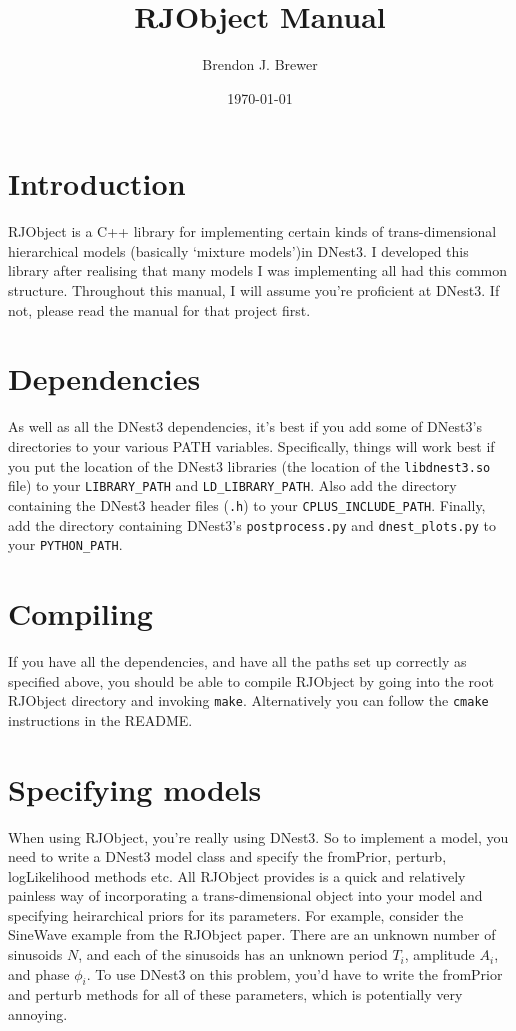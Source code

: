 \documentclass[a4paper, 11pt]{article}
\title{RJObject Manual}
\author{Brendon J. Brewer}
\date{\today}
\begin{document}
\maketitle

\section{Introduction}
RJObject is a C++ library for implementing certain kinds of trans-dimensional
hierarchical models (basically `mixture models')in DNest3. I developed this
library after realising that many models I was implementing all had this
common structure.
Throughout this manual, I will assume you're proficient at
DNest3. If not, please read the manual for that project first.

\section{Dependencies}
As well as all the DNest3 dependencies, it's best if you add some of DNest3's
directories to your various PATH variables. Specifically, things will work best
if you put the location of the DNest3 libraries (the location of
the {\tt libdnest3.so} file) to your {\tt LIBRARY\_PATH} and
{\tt LD\_LIBRARY\_PATH}. Also add the directory containing the DNest3 header
files ({\tt *.h}) to your {\tt CPLUS\_INCLUDE\_PATH}. Finally, add the
directory containing DNest3's {\tt postprocess.py} and {\tt dnest\_plots.py} to
your {\tt PYTHON\_PATH}.

\section{Compiling}
If you have all the dependencies, and have all the paths set up correctly as
specified above, you should be able to compile RJObject by going into the
root RJObject directory and invoking {\tt make}. Alternatively you can follow
the {\tt cmake} instructions in the README.

\section{Specifying models}
When using RJObject, you're really using DNest3. So to implement a model, you
need to write a DNest3 model class and specify the fromPrior, perturb,
logLikelihood methods etc. All RJObject provides is a quick and relatively
painless way of incorporating a trans-dimensional object into your model and
specifying heirarchical priors for its parameters. For example, consider
the SineWave example from the RJObject paper. There are an unknown number of
sinusoids $N$, and each of the sinusoids has an unknown period $T_i$, amplitude
$A_i$, and phase $\phi_i$. To use DNest3 on this problem, you'd have to write
the fromPrior and perturb methods for all of these parameters, which is
potentially very annoying.
\end{document}
